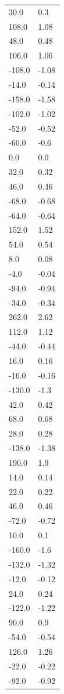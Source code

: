 \begin{longtable}{ll}
30.0 & 0.3 \\
108.0 & 1.08 \\
48.0 & 0.48 \\
106.0 & 1.06 \\
-108.0 & -1.08 \\
-14.0 & -0.14 \\
-158.0 & -1.58 \\
-102.0 & -1.02 \\
-52.0 & -0.52 \\
-60.0 & -0.6 \\
0.0 & 0.0 \\
32.0 & 0.32 \\
46.0 & 0.46 \\
-68.0 & -0.68 \\
-64.0 & -0.64 \\
152.0 & 1.52 \\
54.0 & 0.54 \\
8.0 & 0.08 \\
-4.0 & -0.04 \\
-94.0 & -0.94 \\
-34.0 & -0.34 \\
262.0 & 2.62 \\
112.0 & 1.12 \\
-44.0 & -0.44 \\
16.0 & 0.16 \\
-16.0 & -0.16 \\
-130.0 & -1.3 \\
42.0 & 0.42 \\
68.0 & 0.68 \\
28.0 & 0.28 \\
-138.0 & -1.38 \\
190.0 & 1.9 \\
14.0 & 0.14 \\
22.0 & 0.22 \\
46.0 & 0.46 \\
-72.0 & -0.72 \\
10.0 & 0.1 \\
-160.0 & -1.6 \\
-132.0 & -1.32 \\
-12.0 & -0.12 \\
24.0 & 0.24 \\
-122.0 & -1.22 \\
90.0 & 0.9 \\
-54.0 & -0.54 \\
126.0 & 1.26 \\
-22.0 & -0.22 \\
-92.0 & -0.92 \\

\end{longtable}
